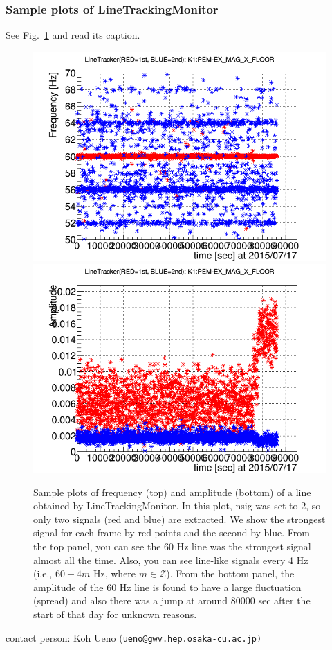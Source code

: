 \vspace{1cm}
\subsubsection{Sample plots of LineTrackingMonitor}
See Fig.~\ref{fig:nha_sample} and read its caption.

\begin{figure}[t]
 \begin{center}
    \includegraphics[width=0.9\hsize]{fig/LineTrackingMon/sample_freq.png}
    \includegraphics[width=0.9\hsize]{fig/LineTrackingMon/sample_amp.png}
    \caption{Sample plots of frequency (top) and amplitude (bottom) of a line obtained by LineTrackingMonitor. In this plot, nsig was set to 2, so only two signals (red and blue) are extracted. We show the strongest signal for each frame by red points and the second by blue. From the top panel, you can see the 60 Hz line was the strongest signal almost all the time. Also, you can see line-like signals every 4 Hz (i.e., $60 + 4m$ Hz, where $m \in \mathcal{Z}$). From the bottom panel, the amplitude of the 60 Hz line is found to have a large fluctuation (spread) and also there was a jump at around 80000 sec after the start of that day for unknown reasons.}
  \label{fig:nha_sample}
 \end{center}
\end{figure}

{\noindent \small contact person: Koh Ueno (\tt ueno@gwv.hep.osaka-cu.ac.jp)}

